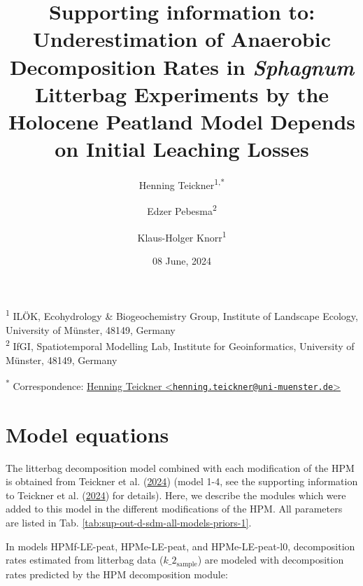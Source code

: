 \documentclass[
  12pt,
]{article}
\title{Supporting information to: Underestimation of Anaerobic Decomposition Rates in \emph{Sphagnum} Litterbag Experiments by the Holocene Peatland Model Depends on Initial Leaching Losses}
\author{Henning Teickner\textsuperscript{1,*} \and Edzer Pebesma\textsuperscript{2} \and Klaus-Holger Knorr\textsuperscript{1}}
\date{08 June, 2024}
\begin{document}
\maketitle

{
\setcounter{tocdepth}{2}
\tableofcontents
}
\textsuperscript{1} ILÖK, Ecohydrology \& Biogeochemistry Group, Institute of Landscape Ecology, University of Münster, 48149, Germany\\
\textsuperscript{2} IfGI, Spatiotemporal Modelling Lab, Institute for Geoinformatics, University of Münster, 48149, Germany

\textsuperscript{*} Correspondence: \href{mailto:henning.teickner@uni-muenster.de}{Henning Teickner \textless{}\href{mailto:henning.teickner@uni-muenster.de}{\nolinkurl{henning.teickner@uni-muenster.de}}\textgreater{}}

\renewcommand{\thefigure}{S\arabic{figure}} 
\renewcommand{\thetable}{S\arabic{table}}
\renewcommand{\thesection}{S\arabic{section}}
\renewcommand{\theequation}{S\arabic{equation}}

\hypertarget{sup-1}{%
\section{Model equations}\label{sup-1}}

The litterbag decomposition model combined with each modification of the HPM is obtained from Teickner et al. (\protect\hyperlink{ref-Teickner.2024f}{2024}) (model 1-4, see the supporting information to Teickner et al. (\protect\hyperlink{ref-Teickner.2024f}{2024}) for details). Here, we describe the modules which were added to this model in the different modifications of the HPM. All parameters are listed in Tab. \ref{tab:sup-out-d-sdm-all-models-priors-1}.

In models HPMf-LE-peat, HPMe-LE-peat, and HPMe-LE-peat-l0, decomposition rates estimated from litterbag data (\(k\_2_{\text{sample}}\)) are modeled with decomposition rates predicted by the HPM decomposition module:
\end{document}
